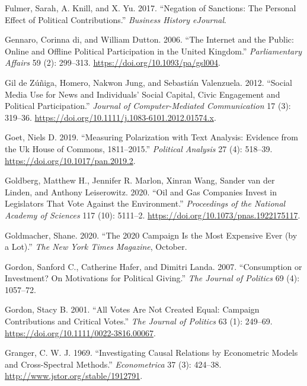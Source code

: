 \documentclass[12pt,]{article}
\begin{document}
\leavevmode\hypertarget{ref-fulmer2017}{}%
Fulmer, Sarah, A. Knill, and X. Yu. 2017. ``Negation of Sanctions: The
Personal Effect of Political Contributions.'' \emph{Business History
eJournal}.

\leavevmode\hypertarget{ref-degennaro2006}{}%
Gennaro, Corinna di, and William Dutton. 2006. ``The Internet and the
Public: Online and Offline Political Participation in the United
Kingdom.'' \emph{Parliamentary Affairs} 59 (2): 299--313.
\url{https://doi.org/10.1093/pa/gsl004}.

\leavevmode\hypertarget{ref-zuniga2012}{}%
Gil de Zúñiga, Homero, Nakwon Jung, and Sebastián Valenzuela. 2012.
``Social Media Use for News and Individuals' Social Capital, Civic
Engagement and Political Participation.'' \emph{Journal of
Computer-Mediated Communication} 17 (3): 319--36.
\url{https://doi.org/10.1111/j.1083-6101.2012.01574.x}.

\leavevmode\hypertarget{ref-goet2019}{}%
Goet, Niels D. 2019. ``Measuring Polarization with Text Analysis:
Evidence from the Uk House of Commons, 1811--2015.'' \emph{Political
Analysis} 27 (4): 518--39. \url{https://doi.org/10.1017/pan.2019.2}.

\leavevmode\hypertarget{ref-goldberg2020}{}%
Goldberg, Matthew H., Jennifer R. Marlon, Xinran Wang, Sander van der
Linden, and Anthony Leiserowitz. 2020. ``Oil and Gas Companies Invest in
Legislators That Vote Against the Environment.'' \emph{Proceedings of
the National Academy of Sciences} 117 (10): 5111--2.
\url{https://doi.org/10.1073/pnas.1922175117}.

\leavevmode\hypertarget{ref-goldmacher2020}{}%
Goldmacher, Shane. 2020. ``The 2020 Campaign Is the Most Expensive Ever
(by a Lot).'' \emph{The New York Times Magazine}, October.

\leavevmode\hypertarget{ref-gordon2007}{}%
Gordon, Sanford C., Catherine Hafer, and Dimitri Landa. 2007.
``Consumption or Investment? On Motivations for Political Giving.''
\emph{The Journal of Politics} 69 (4): 1057--72.

\leavevmode\hypertarget{ref-gordon2001}{}%
Gordon, Stacy B. 2001. ``All Votes Are Not Created Equal: Campaign
Contributions and Critical Votes.'' \emph{The Journal of Politics} 63
(1): 249--69. \url{https://doi.org/10.1111/0022-3816.00067}.

\leavevmode\hypertarget{ref-granger}{}%
Granger, C. W. J. 1969. ``Investigating Causal Relations by Econometric
Models and Cross-Spectral Methods.'' \emph{Econometrica} 37 (3):
424--38. \url{http://www.jstor.org/stable/1912791}.
\end{document}
